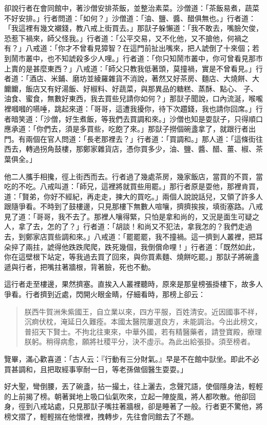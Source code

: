 卻說行者在會同館中，著沙僧安排茶飯，並整治素菜。沙僧道：「茶飯易煮，蔬菜不好安排。」行者問道：「如何？」沙僧道：「油、鹽、醬、醋俱無也。」行者道：「我這裡有幾文襯錢，教八戒上街買去。」那獃子躲懶道：「我不敢去，嘴臉欠俊，恐惹下禍來，師父怪我。」行者道：「公平交易，又不化他，又不搶他，何禍之有？」八戒道：「你才不曾看見獐智？在這門前扯出嘴來，把人諕倒了十來個；若到鬧市叢中，也不知諕殺多少人哩。」行者道：「你只知鬧市叢中，你可曾看見那市上賣的是甚麼東西？」八戒道：「師父只教我低著頭，莫撞禍，實是不曾看見。」行者道：「酒店、米鋪、磨坊並綾羅雜貨不消說，著然又好茶房、麵店、大燒餅、大饝饝，飯店又有好湯飯、好椒料、好蔬菜，與那異品的糖糕、蒸酥、點心、𩜇子、油食、蜜食，無數好東西，我去買些兒請你如何？」那獃子聞說，口內流涎，喉嚨裡嘓嘓的嚥唾，跳起來道：「哥哥，這遭我擾你，待下次趲錢，我也請你回席。」行者暗笑道：「沙僧，好生煮飯，等我們去買調和來。」沙僧也知是耍獃子，只得順口應承道：「你們去，須是多買些，吃飽了來。」那獃子撈個碗盞拿了，就跟行者出門。有兩個在官人問道：「長老那裡去？」行者道：「買調和。」那人道：「這條街往西去，轉過拐角鼓樓，那鄭家雜貨店，憑你買多少，油、鹽、醬、醋、薑、椒、茶葉俱全。」

他二人攜手相攙，徑上街西而去。行者過了幾處茶房，幾家飯店，當買的不買，當吃的不吃。八戒叫道：「師兄，這裡將就買些用罷。」那行者原是耍他，那裡肯買，道：「賢弟，你好不經紀，再走走，揀大的買吃。」兩個人說說話兒，又領了許多人跟隨爭看。不時到了鼓樓邊，只見那樓下無數人喧嚷，擠擠挨挨，填街塞路。八戒見了道：「哥哥，我不去了。那裡人嚷得緊，只怕是拿和尚的，又況是面生可疑之人，拿了去，怎的了？」行者道：「胡談！和尚又不犯法，拿我怎的？我們走過去，到鄭家店買些調和來。」八戒道：「罷罷罷，我不撞禍。這一擠到人叢裡，把耳朵捽了兩拄，諕得他跌跌爬爬，跌死幾個，我倒償命哩！」行者道：「既然如此，你在這壁根下站定，等我過去買了回來，與你買素麵、燒餅吃罷。」那獃子將碗盞遞與行者，把嘴拄著牆根，背著臉，死也不動。

這行者走至樓邊，果然擠塞。直挨入人叢裡聽時，原來是那皇榜張掛樓下，故多人爭看。行者擠到近處，閃開火眼金睛，仔細看時，那榜上卻云：
\begin{quote}
朕西牛賀洲朱紫國王，自立業以來，四方平服，百姓清安。近因國事不祥，沉痾伏枕，淹延日久難痊。本國太醫院屢選良方，未能調治。今出此榜文，普招天下賢士。不拘北往東來，中華外國，若有精醫藥者，請登寶殿，療理朕躬。稍得病愈，願將社稷平分，決不虛示。為此出給張掛。須至榜者。
\end{quote}

覽畢，滿心歡喜道：「古人云：『行動有三分財氣。』早是不在館中獃坐。即此不必買甚調和，且把取經事寧耐一日，等老孫做個醫生耍耍。」

好大聖，彎倒腰，丟了碗盞，拈一撮土，往上灑去，念聲咒語，使個隱身法，輕輕的上前揭了榜。朝著巽地上吸口仙氣吹來，立起一陣旋風，將人都吹散。他卻回身，徑到八戒站處，只見那獃子嘴拄著牆根，卻是睡著了一般。行者更不驚他，將榜文摺了，輕輕揣在他懷裡，拽轉步，先往會同館去了不題。


